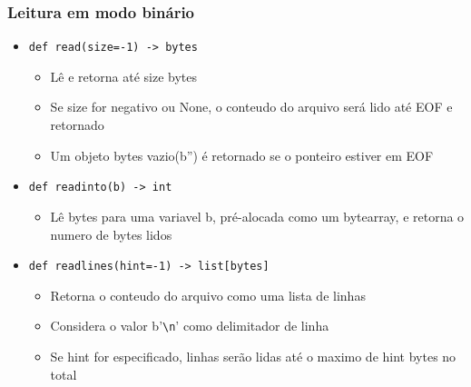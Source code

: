\documentclass[12pt]{article}
\begin{document}
            \subsubsection{Leitura em modo binário}
            \begin{itemize}
                \item \verb|def read(size=-1) -> bytes|
                \begin{itemize}
                    \item Lê e retorna até size bytes
                    \item Se size for negativo ou None, o conteudo do arquivo 
                    será lido até EOF e retornado 
                    \item Um objeto bytes vazio(b'') é retornado se o ponteiro 
                    estiver em EOF
                \end{itemize}
                \item \verb|def readinto(b) -> int|
                \begin{itemize}
                    \item Lê bytes para uma variavel b, pré-alocada como um 
                    bytearray, e retorna o numero de bytes lidos
                \end{itemize}
                \item \verb|def readlines(hint=-1) -> list[bytes]|
                \begin{itemize}
                    \item Retorna o conteudo do arquivo como uma lista de linhas
                    \item Considera o valor b'\verb|\n|' como delimitador de 
                    linha
                    \item Se hint for especificado, linhas serão lidas até o 
                    maximo de hint bytes no total
                \end{itemize}
            \end{itemize}
\end{document}
